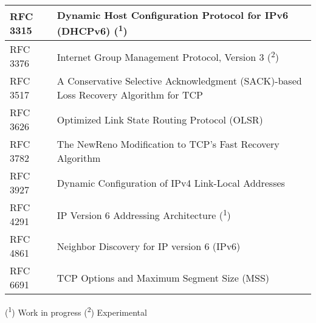 \begin{longtable}{ | l | p{15cm} | }
RFC 3315 &
Dynamic Host Configuration Protocol for IPv6 (DHCPv6) (\textsuperscript{1}) \\ \hline

RFC 3376 &
Internet Group Management Protocol, Version 3 (\textsuperscript{2}) \\ \hline

RFC 3517 &
A Conservative Selective Acknowledgment (SACK)-based Loss Recovery Algorithm for TCP \\ \hline

RFC 3626 &
Optimized Link State Routing Protocol (OLSR) \\ \hline

RFC 3782 &
The NewReno Modification to TCP's Fast Recovery Algorithm \\ \hline

RFC 3927 &
Dynamic Configuration of IPv4 Link-Local Addresses \\ \hline

RFC 4291 &
IP Version 6 Addressing Architecture (\textsuperscript{1}) \\ \hline

RFC 4861 &
Neighbor Discovery for IP version 6 (IPv6) \\ \hline

RFC 6691 &
TCP Options and Maximum Segment Size (MSS) \\ \hline

\end{longtable}

(\textsuperscript{1}) Work in progress
(\textsuperscript{2}) Experimental
